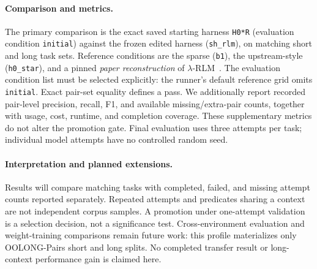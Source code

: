 \paragraph{Comparison and metrics.}
\label{sec:baselines}
The primary comparison is the exact saved starting harness \texttt{H0*R}
(evaluation condition \texttt{initial}) against the frozen edited harness
(\texttt{sh\_rlm}), on matching short and long task sets. Reference conditions
are the sparse \hzero{} (\texttt{b1}), the upstream-style \hzerostar{}
(\texttt{h0\_star}), and a pinned \emph{paper reconstruction} of
$\lambda$-RLM~\citep{roy2026ycombinator}. The evaluation condition list must be
selected explicitly: the runner's default reference grid omits \texttt{initial}.
Exact pair-set equality defines a pass. We additionally report recorded
pair-level precision, recall, F1, and available missing/extra-pair counts,
together with usage, cost, runtime, and completion coverage. These supplementary
metrics do not alter the promotion gate. Final evaluation uses three attempts
per task; individual model attempts have no controlled random seed.

\paragraph{Interpretation and planned extensions.}
Results will compare matching tasks with completed, failed, and missing attempt
counts reported separately. Repeated attempts and predicates sharing a context
are not independent corpus samples. A promotion under one-attempt validation
is a selection decision, not a significance test. Cross-environment evaluation
and weight-training comparisons remain future work: this profile materializes
only OOLONG-Pairs short and long splits. No completed transfer result or
long-context performance gain is claimed here.
